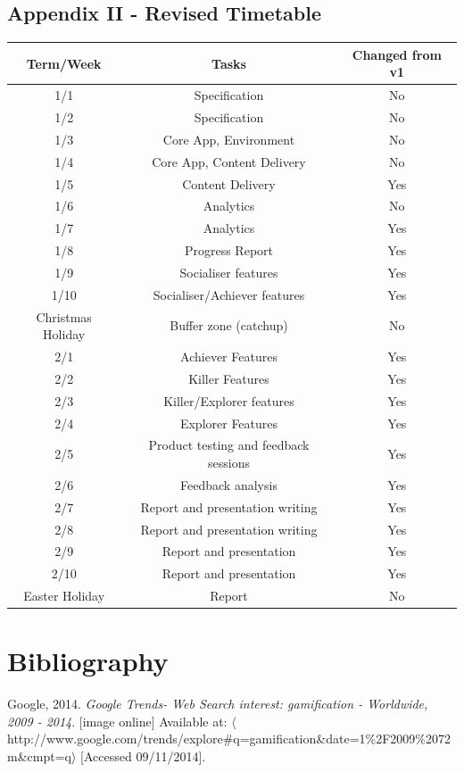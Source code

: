 \documentclass[10pt,a4paper]{report}
\begin{document}
\subsection*{Appendix II - Revised Timetable}
\begin{tabular}{|c|c|c|}
	\hline Term/Week & Tasks & Changed from v1 \\ 
	\hline 1/1 & Specification & No \\ 
	\hline 1/2 & Specification & No \\ 
	\hline 1/3 & Core App, Environment & No \\ 
	\hline 1/4 & Core App, Content Delivery & No \\
	\hline 1/5 & Content Delivery & Yes \\
	\hline 1/6 & Analytics & No \\ 
	\hline 1/7 & Analytics & Yes \\    
	\hline 1/8 & Progress Report & Yes \\
	\hline 1/9 & Socialiser features & Yes \\
	\hline 1/10 & Socialiser/Achiever features & Yes \\
	\hline Christmas Holiday & Buffer zone (catchup) & No \\
	\hline 2/1 & Achiever Features & Yes \\ 
	\hline 2/2 & Killer Features & Yes \\ 
	\hline 2/3 & Killer/Explorer features & Yes \\ 
	\hline 2/4 & Explorer Features & Yes \\ 
	\hline 2/5 & Product testing and feedback sessions & Yes \\ 
	\hline 2/6 & Feedback analysis & Yes \\ 
	\hline 2/7 & Report and presentation writing & Yes \\ 
	\hline 2/8 & Report and presentation writing & Yes \\ 
	\hline 2/9 & Report and presentation & Yes \\ 
	\hline 2/10 & Report and presentation & Yes \\
	\hline Easter Holiday & Report & No \\
	\hline 
\end{tabular}
\section*{Bibliography}
Google, 2014. \textit{Google Trends- Web Search interest: gamification - Worldwide, 2009 - 2014}. [image online] Available at: $\langle$http://www.google.com/trends/explore\#q=gamification\&date=1\%2F2009\%2072m\&cmpt=q$\rangle$ [Accessed 09/11/2014].
\newline
\end{document}
